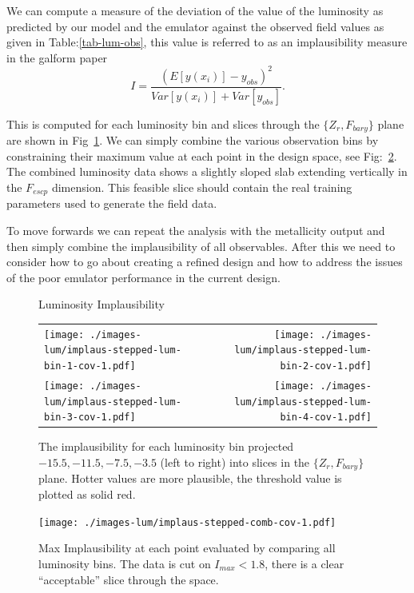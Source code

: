 \documentclass[11pt]{article}
\begin{document}
We can compute a measure of the deviation of the value of the luminosity as predicted by our model and the emulator against the observed field values as given in Table:\ref{tab-lum-obs}, this value is referred to as an implausibility measure in the galform paper
\[
I = \frac{ ( E[y(x_{i})] - y_{obs})^2 }{Var[y(x_{i})] + Var[y_{obs}]}.
\] 

This is computed for each luminosity bin and slices through the
$\{Z_{r}, F_{bary} \}$ plane are shown in
Fig~\ref{fig-implaus-slices}. We can simply combine the various
observation bins  by constraining their maximum value at each point in
the design space, see Fig:~\ref{fig-implaus-comb-slices}. The
combined luminosity data shows a slightly sloped slab extending
vertically in the $F_{escp}$ dimension. This feasible slice should
contain the real training parameters used to generate the field
data. 

To move forwards we can repeat the analysis with the metallicity
output and then simply combine the implausibility of all
observables. After this we need to consider how to go about creating a
refined design and how to address the issues of the poor emulator
performance in the current design. 


\begin{figure}
  \begin{center}
    \large{Luminosity Implausibility}
  \end{center}
  \begin{tabular}{l r} 
    \texttt{[image: ./images-lum/implaus-stepped-lum-bin-1-cov-1.pdf]} &
    \texttt{[image: ./images-lum/implaus-stepped-lum-bin-2-cov-1.pdf]} \\
    \texttt{[image: ./images-lum/implaus-stepped-lum-bin-3-cov-1.pdf]} &
    \texttt{[image: ./images-lum/implaus-stepped-lum-bin-4-cov-1.pdf]} \\
  \end{tabular}
  \caption{The implausibility for each luminosity bin projected $-15.5,
    -11.5, -7.5, -3.5$ (left to right) into slices in the $\{Z_r,
    F_{bary}\}$ plane. Hotter values are more plausible, the threshold
    value is plotted as solid red.}
  \label{fig-implaus-slices}
\end{figure}


\begin{figure}
  \begin{center}
    \texttt{[image: ./images-lum/implaus-stepped-comb-cov-1.pdf]}
    \caption{Max Implausibility at each point evaluated by comparing
      all luminosity bins. The data is cut on $I_{max} <
      1.8$, there is a clear ``acceptable'' slice through the
      space.}
    \label{fig-implaus-comb-slices}
    \end{center}
\end{figure}
\end{document}
